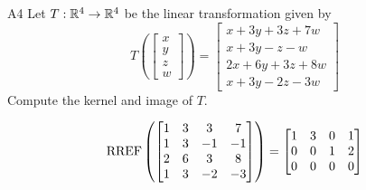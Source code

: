 \begin{problem}{A4}
Let $T: \mathbb{R}^4\rightarrow \mathbb{R}^4$ be the linear transformation given by $$T\left(\begin{bmatrix} x \\ y \\ z \\ w \end{bmatrix} \right) = \begin{bmatrix} x+3y+3z+7w \\ x+3y-z-w \\ 2x+6y+3z+8w \\ x+3y-2z-3w \end{bmatrix}$$
Compute the kernel and image of $T$.
\end{problem}
\begin{solution}

$$\operatorname{RREF}\left(\begin{bmatrix} 1 & 3 & 3 & 7 \\ 1 & 3 & -1 & -1 \\ 2 & 6 & 3 & 8 \\ 1 & 3 & -2 & -3 \end{bmatrix}\right) = \begin{bmatrix} 1 & 3 & 0 & 1 \\ 0 & 0 & 1 & 2 \\ 0 & 0 & 0 & 0 \end{bmatrix}$$


\end{solution}
